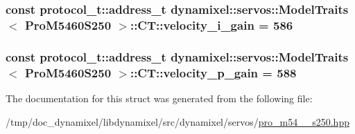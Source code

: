 \subsubsection[{velocity\+\_\+i\+\_\+gain}]{\setlength{\rightskip}{0pt plus 5cm}const {\bf protocol\+\_\+t\+::address\+\_\+t} {\bf dynamixel\+::servos\+::\+Model\+Traits}$<$ {\bf Pro\+M5460\+S250} $>$\+::C\+T\+::velocity\+\_\+i\+\_\+gain = 586\hspace{0.3cm}{\ttfamily [static]}}\label{structdynamixel_1_1servos_1_1_model_traits_3_01_pro_m5460_s250_01_4_1_1_c_t_a624dbdfccd43095e5f07ae740cd47f98}
\hypertarget{structdynamixel_1_1servos_1_1_model_traits_3_01_pro_m5460_s250_01_4_1_1_c_t_ac1b2e2b1e6c3e7b8af39dd171c254394}{}
\subsubsection[{velocity\+\_\+p\+\_\+gain}]{\setlength{\rightskip}{0pt plus 5cm}const {\bf protocol\+\_\+t\+::address\+\_\+t} {\bf dynamixel\+::servos\+::\+Model\+Traits}$<$ {\bf Pro\+M5460\+S250} $>$\+::C\+T\+::velocity\+\_\+p\+\_\+gain = 588\hspace{0.3cm}{\ttfamily [static]}}\label{structdynamixel_1_1servos_1_1_model_traits_3_01_pro_m5460_s250_01_4_1_1_c_t_ac1b2e2b1e6c3e7b8af39dd171c254394}


The documentation for this struct was generated from the following file\+:\begin{DoxyCompactItemize}
\item 
/tmp/doc\+\_\+dynamixel/libdynamixel/src/dynamixel/servos/\hyperlink{pro__m54__60__s250_8hpp}{pro\+\_\+m54\+\_\+\_\+s250.\+hpp}\end{DoxyCompactItemize}
